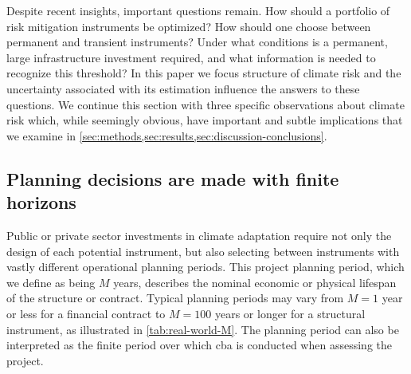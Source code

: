 \documentclass[
  draft,
  linenumbers
]{agujournal2019}
\begin{document}
Despite recent insights, important questions remain.
How should a portfolio of risk mitigation instruments be optimized?
How should one choose between permanent and transient instruments?
Under what conditions is a permanent, large infrastructure investment required, and what information is needed to recognize this threshold?
In this paper we focus  structure of climate risk and  the uncertainty associated with its estimation\remove{,} influence the answers to these questions.
We continue this section with three specific observations about climate risk which, while seemingly obvious, have important and subtle implications that we examine in \cref{sec:methods,sec:results,sec:discussion-conclusions}.

\subsection{Planning decisions are made with finite horizons}\label{sec:intro-finite}

Public or private sector investments in climate adaptation require not only the design of each potential instrument, but also selecting between instruments with vastly different operational planning periods.
This project planning period, which we define as being $M$ years, describes the nominal economic or physical lifespan of the structure or contract.
Typical planning periods may vary from $M=1$ year or less for a financial contract to $M=100$ years or longer for a structural instrument, as illustrated in \cref{tab:real-world-M}.
The planning period can also be interpreted as the finite period over which \gls{cba} is conducted when assessing the project.
\end{document}
